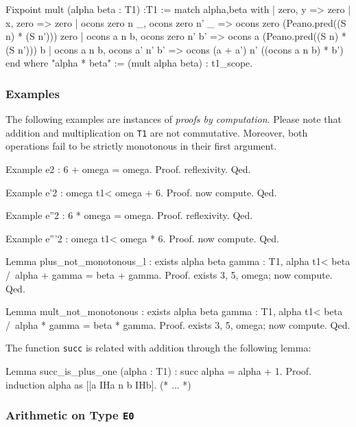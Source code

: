\begin{Coqsrc}
Fixpoint mult (alpha beta : T1) :T1 :=
  match alpha,beta with
 |  zero, y  => zero
 |  x, zero => zero
 |  ocons zero n _, ocons zero n' _ => 
                 ocons zero (Peano.pred((S n) * (S n'))) zero
 |  ocons a n b, ocons zero n' b' =>  
                 ocons a (Peano.pred((S n) * (S n'))) b
 |  ocons a n b, ocons a' n' b' =>
     ocons (a + a') n' ((ocons a n b) * b')
 end
where  "alpha * beta" := (mult alpha beta) : t1_scope.
\end{Coqsrc}


\subsubsection{Examples}

The following examples are instances of \emph{proofs by computation}. Please note that  addition and multiplication on \texttt{T1}
are not commutative. Moreover,  both operations fail to be strictly monotonous in their first argument.


\begin{Coqsrc}
Example e2 : 6 + omega = omega.
Proof. reflexivity. Qed.

Example e'2 : omega t1< omega + 6.
Proof. now compute. Qed.

Example e''2 : 6 * omega = omega.
Proof. reflexivity. Qed.

Example e'''2 : omega t1< omega * 6.
Proof. now compute. Qed.
\end{Coqsrc}

\begin{Coqsrc}
Lemma plus_not_monotonous_l : exists alpha beta gamma : T1,
    alpha t1< beta /\ alpha + gamma = beta + gamma.
Proof.
  exists 3, 5, omega;  now  compute.
Qed.

Lemma mult_not_monotonous :  exists alpha beta gamma : T1,
      alpha t1< beta /\ alpha * gamma = beta * gamma.
Proof.
  exists 3, 5, omega; now compute.
Qed.
\end{Coqsrc}

The function \texttt{succ} is related with addition through the following lemma:

\begin{Coqsrc}
Lemma succ_is_plus_one (alpha : T1) :  succ alpha = alpha + 1.
Proof.
  induction alpha as [|a IHa n b IHb].
  (* ... *)
\end{Coqsrc}



\subsubsection{Arithmetic on Type \texttt{E0}}

